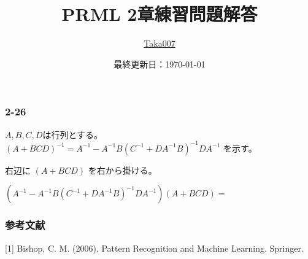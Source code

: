 \documentclass[platex,dvipdfmx]{jlreq}            %
\title{PRML 2章練習問題解答}
\author{\href{https://github.com/Taka0007}{Taka007}}
\date{最終更新日：\today}
\begin{document}
\maketitle



\subsubsection*{2-26}
$A,B,C,D$は行列とする。\\
$
(A + BCD)^{-1} 
=  A^{-1} -  A^{-1}B (C^{-1} + D A^{-1} B)^{-1} D A^{-1}
$
を示す。

右辺に
$
(A + BCD)
$
を右から掛ける。

$
(A^{-1} -  A^{-1}B (C^{-1} + D A^{-1} B)^{-1} D A^{-1}) (A + BCD)
= 
$












\subsubsection*{参考文献}

[1] Bishop, C. M. (2006). Pattern Recognition and Machine Learning. Springer.
\end{document}
